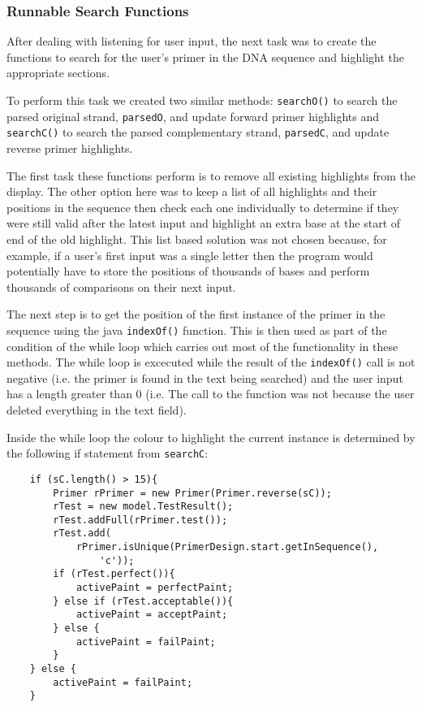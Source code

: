 \subsubsection{Runnable Search Functions}

After dealing with listening for user input, the next task was to create
the functions to search for the user's primer in the DNA sequence and
highlight the appropriate sections.

To perform this task we created two similar methods: \texttt{searchO()}
to search the parsed original strand, \texttt{parsedO}, and update forward
primer highlights and \texttt{searchC()} to search the parsed
complementary strand, \texttt{parsedC}, and update reverse primer
highlights.

The first task these functions perform is to remove all existing
highlights from the display. The other option here was to keep a list of
all highlights and their positions in the sequence then check each one
individually to determine if they were still valid after the latest
input and highlight an extra base at the start of end of the old
highlight. This list based solution was not chosen because, for example,
if a user's first input was a single letter then the program would
potentially have to store the positions of thousands of bases and
perform thousands of comparisons on their next input.

The next step is to get the position of the first instance of the primer
in the sequence using the java \texttt{indexOf()} function. This is then
used as part of the condition of the while loop which carries out most
of the functionality in these methods. The while loop is excecuted while
the result of the \texttt{indexOf()} call is not negative (i.e. the
primer is found in the text being searched) and the user input has a
length greater than 0 (i.e. The call to the function was not because the
user deleted everything in the text field).

Inside the while loop the colour to highlight the current instance is
determined by the following if statement from \texttt{searchC}:

\begin{lstlisting}
    if (sC.length() > 15){
        Primer rPrimer = new Primer(Primer.reverse(sC));
        rTest = new model.TestResult();
        rTest.addFull(rPrimer.test());
        rTest.add(
            rPrimer.isUnique(PrimerDesign.start.getInSequence(),
                'c'));
        if (rTest.perfect()){
            activePaint = perfectPaint;
        } else if (rTest.acceptable()){
            activePaint = acceptPaint;
        } else {
            activePaint = failPaint;
        }
    } else {
        activePaint = failPaint;
    } 
\end{lstlisting}

